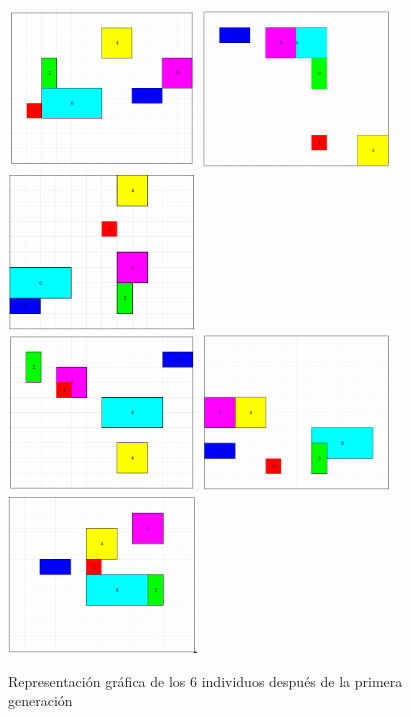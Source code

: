 \documentclass[a4paper]{article}
\begin{document}
\begin{figure}[h]
\includegraphics[width=5cm]{./pics/indiv1.png}
\includegraphics[width=5cm]{./pics/new1.png}
\includegraphics[width=5cm]{./pics/indiv3.png} \\
\includegraphics[width=5cm]{./pics/new3.png}
\includegraphics[width=5cm]{./pics/new4.png}
\includegraphics[width=5cm]{./pics/indiv6.png}
\caption{Representación gráfica de los 6 individuos después de la primera generación}
\end{figure}
\end{document}
